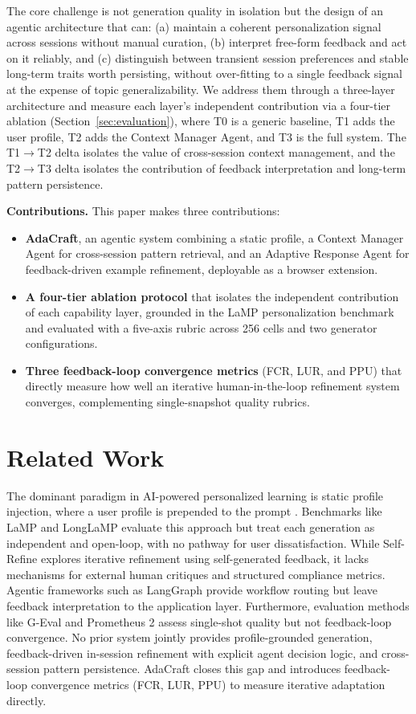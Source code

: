 \documentclass[conference]{IEEEtran}
\begin{document}
The core challenge is not generation quality in isolation but the design of an agentic architecture that can: (a) maintain a coherent personalization signal across sessions without manual curation, (b) interpret free-form feedback and act on it reliably, and (c) distinguish between transient session preferences and stable long-term traits worth persisting, without over-fitting to a single feedback signal at the expense of topic generalizability. We address them through a three-layer architecture and measure each layer's independent contribution via a four-tier ablation (Section~\ref{sec:evaluation}), where T0 is a generic baseline, T1 adds the user profile, T2 adds the Context Manager Agent, and T3 is the full system. The T1$\to$T2 delta isolates the value of cross-session context management, and the T2$\to$T3 delta isolates the contribution of feedback interpretation and long-term pattern persistence.

\textbf{Contributions.} This paper makes three contributions:
\begin{itemize}
    \item \textbf{AdaCraft}, an agentic system combining a static profile, a Context Manager Agent for cross-session pattern retrieval, and an Adaptive Response Agent for feedback-driven example refinement, deployable as a browser extension.
    \item \textbf{A four-tier ablation protocol} that isolates the independent contribution of each capability layer, grounded in the LaMP personalization benchmark and evaluated with a five-axis rubric across 256 cells and two generator configurations.
    \item \textbf{Three feedback-loop convergence metrics} (FCR, LUR, and PPU) that directly measure how well an iterative human-in-the-loop refinement system converges, complementing single-snapshot quality rubrics.
\end{itemize}

\section{Related Work}

The dominant paradigm in AI-powered personalized learning is static profile injection, where a user profile is prepended to the prompt \cite{b1,b2}. Benchmarks like LaMP \cite{b3} and LongLaMP \cite{b8} evaluate this approach but treat each generation as independent and open-loop, with no pathway for user dissatisfaction. While Self-Refine \cite{b12} explores iterative refinement using self-generated feedback, it lacks mechanisms for external human critiques and structured compliance metrics. Agentic frameworks such as LangGraph \cite{b9} provide workflow routing but leave feedback interpretation to the application layer. Furthermore, evaluation methods like G-Eval \cite{b4} and Prometheus 2 \cite{b5} assess single-shot quality but not feedback-loop convergence. No prior system jointly provides profile-grounded generation, feedback-driven in-session refinement with explicit agent decision logic, and cross-session pattern persistence. AdaCraft closes this gap and introduces feedback-loop convergence metrics (FCR, LUR, PPU) to measure iterative adaptation directly.
\end{document}
